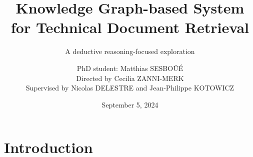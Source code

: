 

\title{Knowledge Graph-based System for Technical Document Retrieval}
\subtitle{A deductive reasoning-focused exploration\vspace{-1em}}
\author[Matthias SESBO{\"U}{\'E}]{PhD student: Matthias SESBO{\"U}{\'E}\\Directed by Cecilia ZANNI-MERK\\Supervised by Nicolas DELESTRE and Jean-Philippe KOTOWICZ\vspace{-1em}}
\date{September 5, 2024}


    
    
    
    \section{Introduction}
    
    
